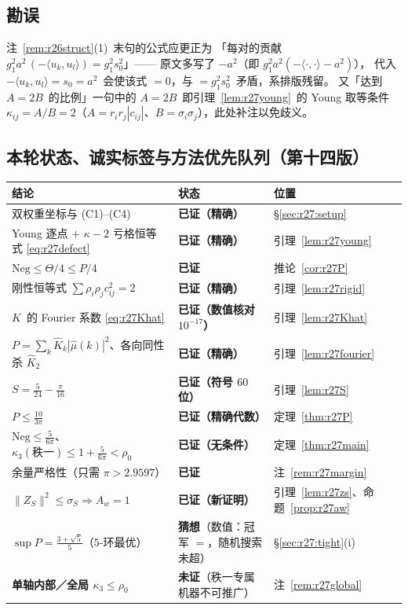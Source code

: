 \documentclass[UTF8,11pt]{ctexart}
\theoremstyle{definition}
\begin{document}
\subsection{勘误}\label{sec:r27:erratum}

注~\ref{rem:r26struct}(1)~末句的公式应更正为
「每对的贡献 $g_1^2a^2\,(-\langle u_k,u_l\rangle)=g_1^2s_0^2$」——
原文多写了 $-a^2$（即 $g_1^2a^2(-\langle\cdot,\cdot\rangle-a^2)$），
代入 $-\langle u_k,u_l\rangle=s_0=a^2$~会使该式 $=0$，与 $=g_1^2s_0^2$~矛盾，系排版残留。
又「达到 $A=2B$~的比例」一句中的 $A=2B$~即引理~\ref{lem:r27young}~的 Young 取等条件
$\kappa_{ij}=A/B=2$（$A=r_ir_j|c_{ij}|$、$B=\sigma_i\sigma_j$），此处补注以免歧义。

\subsection{本轮状态、诚实标签与方法优先队列（第十四版）}\label{sec:r27:status}

\begin{center}\small
\begin{tabular}{lll}
\toprule
结论 & 状态 & 位置\\
\midrule
双权重坐标与 (C1)--(C4) & \textbf{已证（精确）} & \S\ref{sec:r27:setup}\\
Young 逐点 $+$ $\kappa-2$ 亏格恒等式 \eqref{eq:r27defect} & \textbf{已证（精确）} & 引理~\ref{lem:r27young}\\
$\mathrm{Neg}\le\Theta/4\le P/4$ & \textbf{已证} & 推论~\ref{cor:r27P}\\
刚性恒等式 $\sum\rho_i\rho_jc_{ij}^2=2$ & \textbf{已证（精确）} & 引理~\ref{lem:r27rigid}\\
$K$~的 Fourier 系数 \eqref{eq:r27Khat} & \textbf{已证（数值核对 $10^{-17}$）} & 引理~\ref{lem:r27Khat}\\
$P=\sum_k\widehat K_k|\widehat\mu(k)|^2$、各向同性杀 $\widehat K_2$ & \textbf{已证（精确）} & 引理~\ref{lem:r27fourier}\\
$S=\frac5{24}-\frac\pi{16}$ & \textbf{已证（符号 $60$ 位）} & 引理~\ref{lem:r27S}\\
$P\le\frac{10}{3\pi}$ & \textbf{已证（精确代数）} & 定理~\ref{thm:r27P}\\
$\mathrm{Neg}\le\frac5{6\pi}$、$\kappa_3(\text{秩一})\le1+\frac5{6\pi}<\rho_0$ & \textbf{已证（无条件）} & 定理~\ref{thm:r27main}\\
余量严格性（只需 $\pi>2.9597$） & \textbf{已证} & 注~\ref{rem:r27margin}\\
$\|Z_S\|^2\le\sigma_S\Rightarrow A_w=1$ & \textbf{已证（新证明）} & 引理~\ref{lem:r27zs}、命题~\ref{prop:r27aw}\\
$\sup P=\frac{3+\sqrt5}5$（$5$-环最优） & \textbf{猜想}（数值：冠军 $=$，随机搜索未超） & \S\ref{sec:r27:tight}(i)\\
\textbf{单轴内部／全局 $\kappa_3\le\rho_0$} & \textbf{未证}（秩一专属机器不可推广） & 注~\ref{rem:r27global}\\
\bottomrule
\end{tabular}
\end{center}
\end{document}

